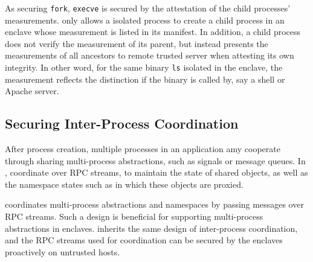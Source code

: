 As securing {\tt fork}, {\tt execve} is secured by the attestation of
the child processes' measurements.
\sysname{} only allows a isolated process to create a child process
in an enclave whose measurement is listed in its manifest.
In addition, a child process does not verify the measurement of its parent,
but instead presents the measurements of all ancestors
to remote trusted server when attesting its own integrity.
In other word, for the same binary {\tt ls} isolated in the enclave,
the measurement reflects the distinction if the binary is called by,
say a shell or Apache server.


\subsection{Securing Inter-Process Coordination}
\label{sec:graphene:multiproc:ipc}

After process creation, multiple processes in an application amy cooperate
through sharing multi-process abstractions,
such as signals or message queues.
In \graphene{}, \picoprocs{} coordinate over RPC streams,
to maintain the state of shared objects,
as well as 
the namespace states such as in which \picoprocs{} these objects are proxied.

\graphene{} coordinates multi-process abstractions and namespaces
by passing messages over RPC streams.
Such a design is beneficial for supporting multi-process abstractions in enclaves.
\sysname{} inherits the same design of inter-process coordination,
and the RPC streams used for coordination can be secured by the enclaves proactively on untrusted hosts.




